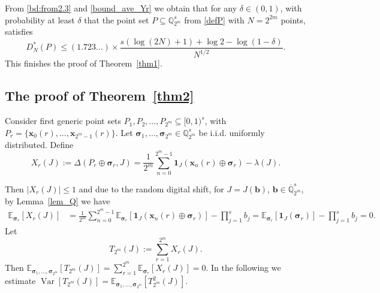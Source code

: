 \documentclass[12pt]{article}
\theoremstyle{definition}
\numberwithin{equation}{section}
\begin{document}
From \eqref{bd:from2.3} and \eqref{bound_ave_Yr} we obtain that for any $\delta \in (0,1)$, with probability at least $\delta$ that the point set $P \subseteq \mathbb{Q}_{2^m}^s$ from \eqref{defP} with $N = 2^{2m}$ points, satisfies
\begin{equation*}
D_N^\ast(P) \le (1.723\ldots) \times  \frac{s (\log(2 N) +1)+ \log 2 - \log(1-\delta)}{N^{1/2}}.
\end{equation*}
This finishes the proof of Theorem~\ref{thm1}.


\subsection{The proof of Theorem~\ref{thm2}}\label{sec:main2}


Consider first generic point sets $P_1, P_2, \ldots, P_{2^m} \subseteq [0,1)^s$, with $P_r = \{\bm{x}_0(r), \ldots, \bm{x}_{2^m-1}(r)\}$. Let $\bm{\sigma}_1, \ldots, \bm{\sigma}_{2^m} \in \mathbb{Q}_{2^m}^s$ be i.i.d. uniformly distributed. Define
\begin{equation*}
X_r(J) := \Delta(P_r \oplus \bm{\sigma}_r, J) = \frac{1}{2^m} \sum_{n=0}^{2^m-1} \bm{1}_J(\bm{x}_n(r) \oplus \bm{\sigma}_{r}) - \lambda(J).
\end{equation*}

Then $|X_r(J)| \le 1$ and due to the random digital shift, for $J=J(\bm{b})$, $\bm{b} \in \overline{\mathbb{Q}}_{2^m}^s$, by Lemma~\ref{lem_Q} we have  
\begin{align*}
\mathbb{E}_{\bm{\sigma}_{r}}[X_r(J)] & = \frac{1}{2^m} \sum_{n=0}^{2^m-1} \mathbb{E}_{\bm{\sigma}_{r}} [\bm{1}_J(\bm{x}_n(r) \oplus \bm{\sigma}_{r})] - \prod_{j=1}^s b_j  = \mathbb{E}_{\bm{\sigma}_{r}} [\bm{1}_{J}(\bm{\sigma}_{r}) ] - \prod_{j=1}^s b_j = 0.
\end{align*}
Let 
\begin{equation*}
T_{2^m}(J) := \sum_{r=1}^{2^m} X_r(J).
\end{equation*}
Then $\mathbb{E}_{\bm{\sigma}_1, \ldots, \bm{\sigma}_{2^m}}[T_{2^m}(J)] = \sum_{r=1}^{2^m} \mathbb{E}_{\bm{\sigma}_{r}}[ X_r(J) ] = 0$. In the following we estimate $\operatorname{Var}[T_{2^m}(J)] = \mathbb{E}_{\bm{\sigma}_1, \ldots, \bm{\sigma}_{2^m}}[ T_{2^m}^2(J)]$.
\end{document}
